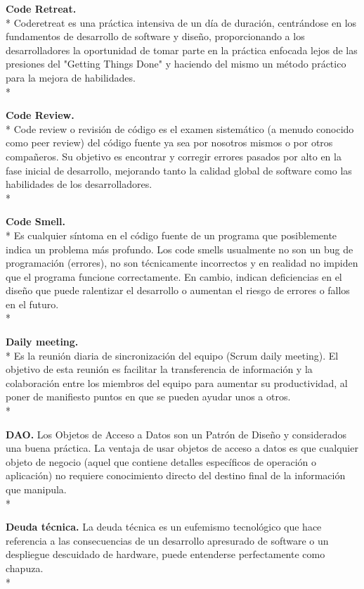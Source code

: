 \documentclass[../pfc.tex]{subfiles}
\begin{document}
	\textbf{Code Retreat.}\\*
	Coderetreat es una práctica intensiva de un día de duración, centrándose en los fundamentos de desarrollo de software y diseño, proporcionando a los desarrolladores la oportunidad de tomar parte en la práctica enfocada lejos de las presiones del "Getting Things Done" y haciendo del mismo un método práctico para la mejora de habilidades.\\*
	
	\textbf{Code Review.}\\*
	Code review o revisión de código es el examen sistemático (a menudo conocido como peer review) del código fuente ya sea por nosotros mismos o por otros compañeros.
	Su objetivo es encontrar y corregir errores pasados por alto en la fase inicial de desarrollo, mejorando tanto la calidad global de software como las habilidades de los desarrolladores.\\*
	
	\textbf{Code Smell.}\\*
	Es cualquier síntoma en el código fuente de un programa que posiblemente indica un problema más profundo. Los code smells usualmente no son un bug de programación (errores), no son técnicamente incorrectos y en realidad no impiden que el programa funcione correctamente. En cambio, indican deficiencias en el diseño que puede ralentizar el desarrollo o aumentan el riesgo de errores o fallos en el futuro.\\*
	
	\textbf{Daily meeting.}\\*
	Es la reunión diaria de sincronización del equipo (Scrum daily meeting).
	El objetivo de esta reunión es facilitar la transferencia de información y la colaboración entre los miembros del equipo para aumentar su productividad, al poner de manifiesto puntos en que se pueden ayudar unos a otros.\\*
	
	\textbf{DAO.}
	Los Objetos de Acceso a Datos son un Patrón de Diseño y considerados una buena práctica.
	La ventaja de usar objetos de acceso a datos es que cualquier objeto de negocio (aquel que contiene detalles específicos de operación o aplicación) no requiere conocimiento directo del destino final de la información que manipula.\\*
	
	\textbf{Deuda técnica.}
	La deuda técnica es un eufemismo tecnológico que hace referencia a las consecuencias de un desarrollo apresurado de software o un despliegue descuidado de hardware, puede entenderse perfectamente como chapuza.\\* 
	
\end{document}
